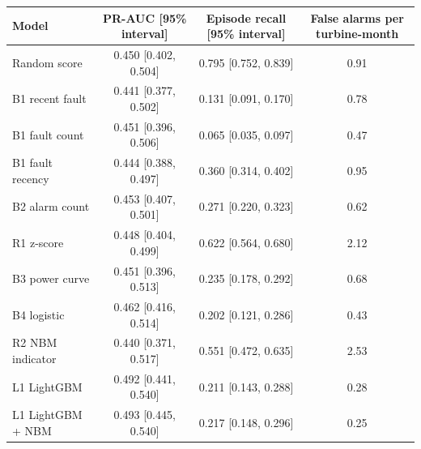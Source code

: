 \begin{tabular}{@{}lccc@{}}
\toprule
Model & PR-AUC [95\% interval] & Episode recall [95\% interval] & False alarms per turbine-month \\
\midrule
Random score & 0.450 [0.402, 0.504] & 0.795 [0.752, 0.839] & 0.91 \\
B1 recent fault & 0.441 [0.377, 0.502] & 0.131 [0.091, 0.170] & 0.78 \\
B1 fault count & 0.451 [0.396, 0.506] & 0.065 [0.035, 0.097] & 0.47 \\
B1 fault recency & 0.444 [0.388, 0.497] & 0.360 [0.314, 0.402] & 0.95 \\
B2 alarm count & 0.453 [0.407, 0.501] & 0.271 [0.220, 0.323] & 0.62 \\
R1 z-score & 0.448 [0.404, 0.499] & 0.622 [0.564, 0.680] & 2.12 \\
B3 power curve & 0.451 [0.396, 0.513] & 0.235 [0.178, 0.292] & 0.68 \\
B4 logistic & 0.462 [0.416, 0.514] & 0.202 [0.121, 0.286] & 0.43 \\
R2 NBM indicator & 0.440 [0.371, 0.517] & 0.551 [0.472, 0.635] & 2.53 \\
L1 LightGBM & 0.492 [0.441, 0.540] & 0.211 [0.143, 0.288] & 0.28 \\
L1 LightGBM + NBM & 0.493 [0.445, 0.540] & 0.217 [0.148, 0.296] & 0.25 \\
\bottomrule
\end{tabular}
